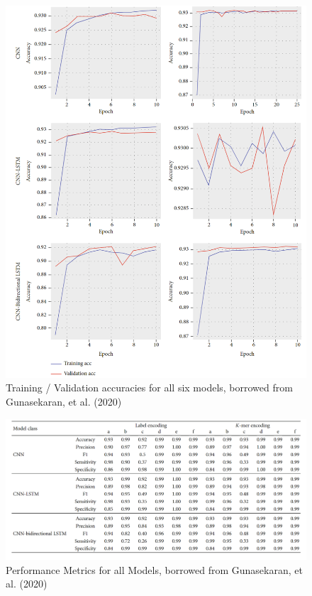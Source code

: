 \documentclass[journal]{IEEEtran}
\begin{document}
\begin{figure}[t]
\centering
  \includegraphics[width=\textwidth]{figures/train_vrs_valid_accuracies.png}
  \caption{Training / Validation accuracies for all six models, borrowed from Gunasekaran, et al. (2020)}
\end{figure}

\begin{figure}[t]
\centering
  \caption{Performance Metrics for all Models, borrowed from Gunasekaran, et al. (2020)}
  \includegraphics[width=\textwidth]{figures/performance_metrics.png}
\end{figure}
\end{document}
